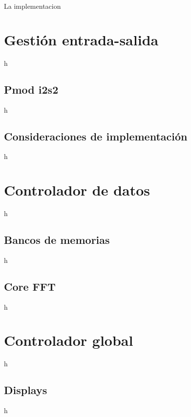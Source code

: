La implementacion
\section{Gestión entrada-salida}
h
\subsection{Pmod i2s2}
h
\subsection{Consideraciones de implementación}
h
\section{Controlador de datos}
h
\subsection{Bancos de memorias}
h
\subsection{Core FFT}
h
\section{Controlador global}
h
\subsection{Displays}
h 